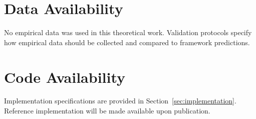 \documentclass[10pt,twocolumn]{article}
\theoremstyle{plain}
\theoremstyle{definition}
\theoremstyle{remark}
\begin{document}
\section*{Data Availability}

No empirical data was used in this theoretical work. Validation protocols specify how empirical data should be collected and compared to framework predictions.

\section*{Code Availability}

Implementation specifications are provided in Section~\ref{sec:implementation}. Reference implementation will be made available upon publication.



\end{document}
